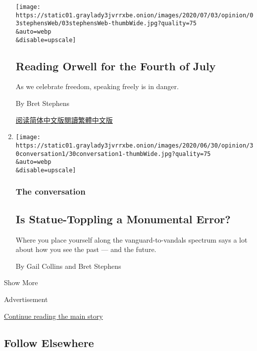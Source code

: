 \begin{enumerate}
  \texttt{[image: https://static01.graylady3jvrrxbe.onion/images/2020/07/03/opinion/03stephensWeb/03stephensWeb-thumbWide.jpg?quality=75\\\&auto=webp\\\&disable=upscale]}

  \hypertarget{reading-orwell-for-the-fourth-of-july}{%
  \subsection{Reading Orwell for the Fourth of
  July}\label{reading-orwell-for-the-fourth-of-july}}

  As we celebrate freedom, speaking freely is in danger.

  By Bret Stephens

  \href{https://cn.nytimes3xbfgragh.onion/opinion/20200706/orwell-fourth-of-july/}{阅读简体中文版}\href{https://cn.nytimes3xbfgragh.onion/opinion/20200706/orwell-fourth-of-july/zh-hant/}{閱讀繁體中文版}
\item
  \href{/2020/06/30/opinion/statues-protesters-jefferson-jackson.html}{}

  \texttt{[image: https://static01.graylady3jvrrxbe.onion/images/2020/06/30/opinion/30conversation1/30conversation1-thumbWide.jpg?quality=75\\\&auto=webp\\\&disable=upscale]}

  \hypertarget{the-conversation-4}{%
  \subsubsection{The conversation}\label{the-conversation-4}}

  \hypertarget{is-statue-toppling-a-monumental-error}{%
  \subsection{Is Statue-Toppling a Monumental
  Error?}\label{is-statue-toppling-a-monumental-error}}

  Where you place yourself along the vanguard-to-vandals spectrum says a
  lot about how you see the past --- and the future.

  By Gail Collins and Bret Stephens
\end{enumerate}

Show More

Advertisement

\protect\hyperlink{after-mid2}{Continue reading the main story}

\hypertarget{follow-elsewhere}{%
\subsection{Follow Elsewhere}\label{follow-elsewhere}}

